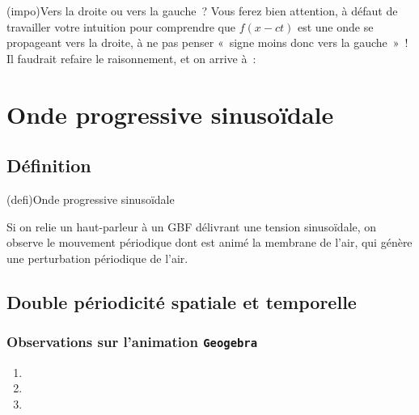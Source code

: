 \documentclass[../../main/main.tex]{subfiles}
\begin{document}
\begin{tcb*}(impo){Vers la droite ou vers la gauche~?}
	Vous ferez bien attention, à défaut de travailler votre intuition pour
	comprendre que $f (x-ct)$ est une onde se propageant vers la droite, à ne pas
	penser «~signe moins donc vers la gauche~»~! Il faudrait refaire le
	raisonnement, et on arrive à~:
	\smallbreak
	\begin{isd}
		\psw{
			\[
				f (x+ct) = g \left( t + \frac{x}{c} \right)
			\]
		}
		\tcblower
		\psw{
			\[
				f (x-ct) = g \left( t - \frac{x}{c} \right)
			\]
		}
	\end{isd}
\end{tcb*}

\section{Onde progressive sinuso\"idale}
\subsection{Définition}

\begin{tcb}(defi){Onde progressive sinusoïdale}
\end{tcb}

Si on relie un haut-parleur à un GBF délivrant une tension sinusoïdale, on
observe le mouvement périodique dont est animé la membrane de l'air, qui génère
une perturbation périodique de l'air.


\subsection{Double périodicité spatiale et temporelle}
\subsubsection{Observations sur l'animation \texttt{Geogebra}}
\begin{enumerate}
	\item
	\item
	\item
\end{enumerate}
\end{document}
